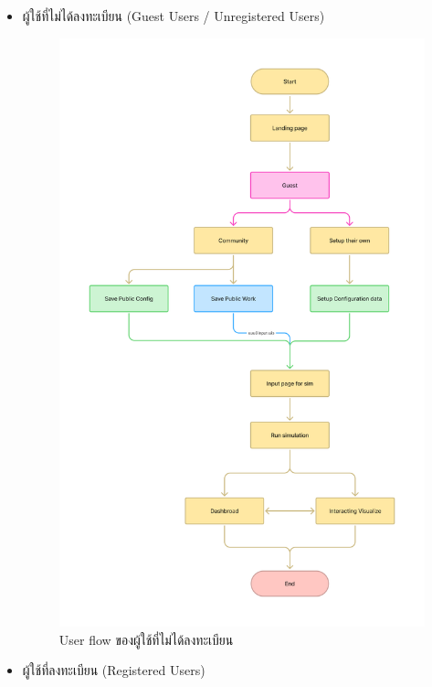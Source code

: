 \begin{mypara}

\begin{itemize}
    \item ผู้ใช้ที่ไม่ได้ลงทะเบียน (Guest Users / Unregistered Users)
    \begin{figure}[H]
    \centering
    \includegraphics[width=\textwidth,height=0.6\textheight,keepaspectratio]{User_flow_-_guest.png}
    \caption{User flow  ของผู้ใช้ที่ไม่ได้ลงทะเบียน}
    \label{fig:UserFlowUnregistered}
    \end{figure}
    \newpage
    \item ผู้ใช้ที่ลงทะเบียน (Registered Users)
    \begin{figure}[H]

\end{figure}
\end{itemize}
\end{mypara}
